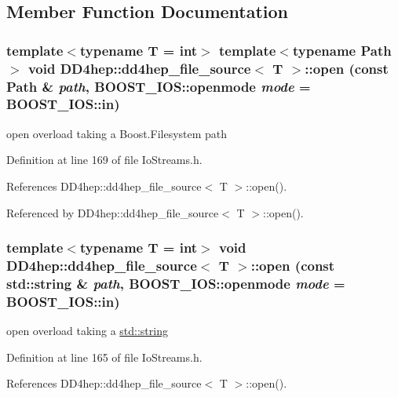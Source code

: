 \subsection{Member Function Documentation}
\hypertarget{class_d_d4hep_1_1dd4hep__file__source_aa001edf36ee67613428927464405bc29}{
\subsubsection[{open}]{\setlength{\rightskip}{0pt plus 5cm}template$<$typename T = int$>$ template$<$typename Path $>$ void {\bf DD4hep::dd4hep\_\-file\_\-source}$<$ {\bf T} $>$::open (const {\bf Path} \& {\em path}, \/  BOOST\_\-IOS::openmode {\em mode} = {\ttfamily BOOST\_\-IOS::in})}}
\label{class_d_d4hep_1_1dd4hep__file__source_aa001edf36ee67613428927464405bc29}


open overload taking a Boost.Filesystem path 

Definition at line 169 of file IoStreams.h.

References DD4hep::dd4hep\_\-file\_\-source$<$ T $>$::open().

Referenced by DD4hep::dd4hep\_\-file\_\-source$<$ T $>$::open().\hypertarget{class_d_d4hep_1_1dd4hep__file__source_aae3ce079b4789a40e59a56e2496e6b8b}{
\subsubsection[{open}]{\setlength{\rightskip}{0pt plus 5cm}template$<$typename T = int$>$ void {\bf DD4hep::dd4hep\_\-file\_\-source}$<$ {\bf T} $>$::open (const std::string \& {\em path}, \/  BOOST\_\-IOS::openmode {\em mode} = {\ttfamily BOOST\_\-IOS::in})}}
\label{class_d_d4hep_1_1dd4hep__file__source_aae3ce079b4789a40e59a56e2496e6b8b}


open overload taking a \hyperlink{classstd_1_1string}{std::string} 

Definition at line 165 of file IoStreams.h.

References DD4hep::dd4hep\_\-file\_\-source$<$ T $>$::open().

